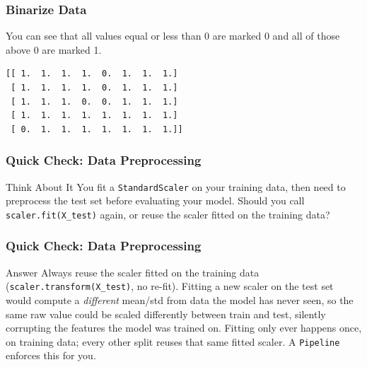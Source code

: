\begin{frame}[fragile]\frametitle{Binarize Data}
You can see that all values equal or less than 0 are marked 0 and all of those above 0 are marked 1.
\begin{lstlisting}
[[ 1.  1.  1.  1.  0.  1.  1.  1.]
 [ 1.  1.  1.  1.  0.  1.  1.  1.]
 [ 1.  1.  1.  0.  0.  1.  1.  1.]
 [ 1.  1.  1.  1.  1.  1.  1.  1.]
 [ 0.  1.  1.  1.  1.  1.  1.  1.]]
\end{lstlisting}
\end{frame}


\begin{frame}[fragile]\frametitle{Quick Check: Data Preprocessing}
\begin{block}{Think About It}
You fit a \texttt{StandardScaler} on your training data, then need to preprocess the test set before evaluating your model. Should you call \texttt{scaler.fit(X\_test)} again, or reuse the scaler fitted on the training data?
\end{block}
\end{frame}

\begin{frame}[fragile]\frametitle{Quick Check: Data Preprocessing}
\begin{block}{Answer}
Always reuse the scaler fitted on the training data (\texttt{scaler.transform(X\_test)}, no re-fit). Fitting a new scaler on the test set would compute a \emph{different} mean/std from data the model has never seen, so the same raw value could be scaled differently between train and test, silently corrupting the features the model was trained on. Fitting only ever happens once, on training data; every other split reuses that same fitted scaler. A \texttt{Pipeline} enforces this for you.
\end{block}
\end{frame}

